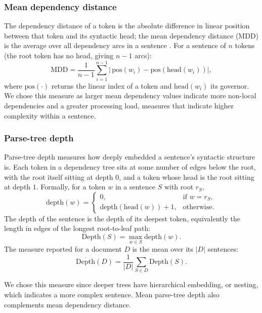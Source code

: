 \documentclass[thesis]{cluu}
\begin{document}
\subsubsection{Mean dependency distance}
The dependency distance of a token is the absolute difference in linear position
between that token and its syntactic head; the mean dependency distance (MDD) is
the average over all dependency arcs in a sentence \parencite{liu2008dependency}. For
a sentence of $n$ tokens (the root token has no head, giving $n-1$ arcs):
\begin{equation}
\mathrm{MDD} = \frac{1}{n-1}\sum_{i=1}^{n-1}
  \bigl|\,\mathrm{pos}(w_i) - \mathrm{pos}\!\left(\mathrm{head}(w_i)\right)\bigr|,
\end{equation}
where $\mathrm{pos}(\cdot)$ returns the linear index of a token and
$\mathrm{head}(w_i)$ its governor. We chose this measure as larger mean dependency values indicate more non-local dependencies and a greater processing load, measures that indicate higher complexity within a sentence.

\subsubsection{Parse-tree depth}
Parse-tree depth measures how deeply embedded a sentence's syntactic structure is.
Each token in a dependency tree sits at some number of edges below the root, with the
root itself sitting at depth $0$, and a token whose head is the root sitting at depth $1$. Formally, for a token
$w$ in a sentence $S$ with root $r_S$,
\begin{equation}
\mathrm{depth}(w) =
\begin{cases}
0, & \text{if } w = r_S,\\[2pt]
\mathrm{depth}\!\left(\mathrm{head}(w)\right) + 1, & \text{otherwise.}
\end{cases}
\end{equation}
The depth of the sentence is the depth of its deepest token, equivalently the
length in edges of the longest root-to-leaf path:
\begin{equation}
\mathrm{Depth}(S) = \max_{w \in S} \mathrm{depth}(w).
\end{equation}
The measure reported for a document $D$ is the mean over its $|D|$ sentences:
\begin{equation}
\overline{\mathrm{Depth}}(D) = \frac{1}{|D|}\sum_{S \in D} \mathrm{Depth}(S).
\end{equation}

We chose this measure since deeper trees have hierarchical embedding, or nesting, which indicates a more complex sentence. Mean parse-tree depth also complements mean dependency distance.
\end{document}
